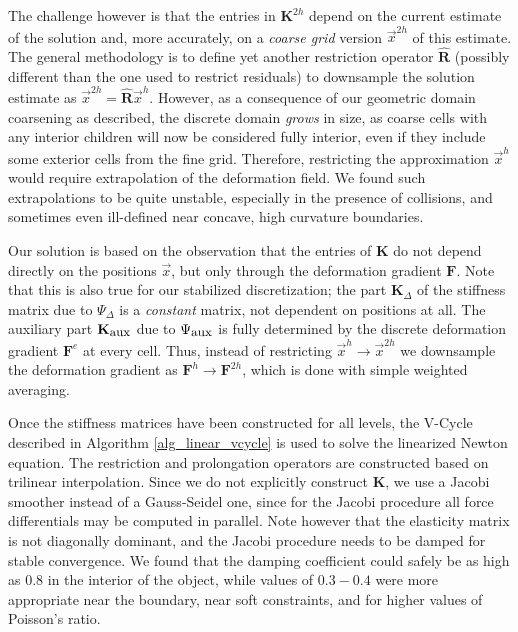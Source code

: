 The challenge however is that the entries in $\mathbf{K}^{2h}$ depend on the current estimate of the solution and, more accurately, on a
\emph{coarse grid} version $\vec{x}^{2h}$ of this estimate. The general methodology is to define yet another restriction operator $\hat{\mathbf{R}}$ (possibly different than the
one used to restrict residuals) to downsample the solution estimate as $\vec{x}^{2h}=\hat{\mathbf{R}}\vec{x}^h$. However, as a consequence of our geometric domain coarsening
as described, the discrete domain \emph{grows} in size, as coarse cells with any interior children will now be considered fully interior, even if they include some
exterior cells from the fine grid. Therefore, restricting the approximation $\vec{x}^h$ would require extrapolation of the deformation field. We found such extrapolations to be
quite unstable, especially in the presence of collisions, and sometimes even ill-defined near concave, high curvature boundaries.

Our solution is based on the observation that the entries of $\mathbf{K}$ do not depend directly on the positions $\vec{x}$, but only through the deformation gradient $\mathbf{F}$. Note
that this is also true for our stabilized discretization; the part $\mathbf{K}_\Delta$ of the stiffness matrix due to $\Psi_\Delta$ is a \emph{constant} matrix, not dependent on positions
at all. The auxiliary part $\mathbf{K}_{\mbox{\small aux}}$ due to $\Psi_{\mbox{\small aux}}$ is fully determined by the discrete deformation gradient $\mathbf{F}^e$ at every
cell. Thus, instead of restricting $\vec{x}^h\rightarrow\vec{x}^{2h}$ we downsample the deformation gradient as $\mathbf{F}^h\rightarrow\mathbf{F}^{2h}$, which is done with
simple weighted averaging. 

Once the stiffness matrices have been constructed for all levels, the V-Cycle described in Algorithm \ref{alg_linear_vcycle} is used to solve the linearized
Newton equation. The restriction and prolongation operators are constructed based on trilinear interpolation. Since we do not explicitly construct $\mathbf{K}$, we use a
Jacobi smoother instead of a Gauss-Seidel one, since for the Jacobi procedure all force differentials may be computed in parallel. Note however that the elasticity matrix is not
diagonally dominant, and the Jacobi procedure needs to be damped for stable convergence. We found that the damping coefficient could safely be as high as $0.8$ in the interior of the
object, while values of $0.3-0.4$ were more appropriate near the boundary, near soft constraints, and for higher values of Poisson's ratio.

